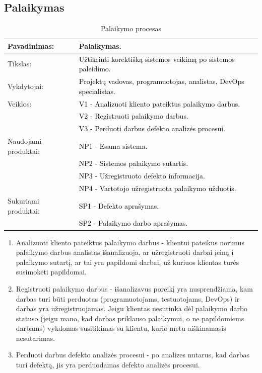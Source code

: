\documentclass{VUMIFPSkursinis}
\begin{document}
	\subsection{Palaikymas}
	\begin{center}
		\begin{table}[ht]
			\caption{Palaikymo procesas}
			\begin{tabular}{ | l | l | }
				\hline
				Pavadinimas:         & Palaikymas.								\\ \hline
				Tikslas:             & \textcolor{black}{Užtikrinti korektišką sistemos veikimą po sistemos paleidimo.}		\\ \hline
				Vykdytojai:          & \textcolor{black}{Projektų vadovas, programuotojas, analistas, DevOps specialistas.}	\\ \hline
				Veiklos:             & \textcolor{black}{V1 - Analizuoti kliento pateiktus palaikymo darbus.	}		\\
				                     & \textcolor{black}{V2 - Registruoti palaikymo darbus. 	}				\\
				                     & \textcolor{black}{V3 - Perduoti darbus defekto analizės procesui.}			\\ \hline
				Naudojami produktai: & \textcolor{black}{NP1 - Esama sistema.	}						\\
				                     & \textcolor{black}{NP2 - Sistemos palaikymo sutartis.	}				\\
				                     & \textcolor{black}{NP3 - Užregistruoto defekto informacija.	}			\\
				                     & \textcolor{black}{NP4 - Vartotojo užregistruota palaikymo užduotis.	}		\\ \hline
				Sukuriami produktai: & \textcolor{black}{SP1 - Defekto aprašymas.	}					\\
				                     & \textcolor{black}{SP2 - Palaikymo darbo aprašymas.	}				\\ \hline
			\end{tabular}
		\end{table}
	\end{center}

	\begin{enumerate}
		\item{
			Analizuoti kliento pateiktus palaikymo darbus - klientui pateikus norimus palaikymo darbus analistas išanalizuoja, ar užregistruoti darbai įeiną į palaikymo sutartį, ar tai yra papildomi darbai, už kuriuos klientas turės susimokėti papildomai.
		}
		\item{
			Registruoti palaikymo darbus - išanalizavus poreikį yra nusprendžiama, kam darbas turi būti perduotas (programuotojams, testuotojams, DevOps) ir darbas yra užregistruojamas.
			Jeigu klientas nesutinka dėl palaikymo darbo statuso (jeigu mano, kad darbas priklauso palaikymui, o ne papildomiems darbams) vykdomas susitikimas su klientu, kurio metu aiškinamasis nesutarimas.
		}
		\item{
			Perduoti darbus defekto analizės procesui - po analizes nutarus, kad darbas turi defektą, jis yra perduodamas defekto analizės procesui.
		}
	\end{enumerate}
\end{document}
